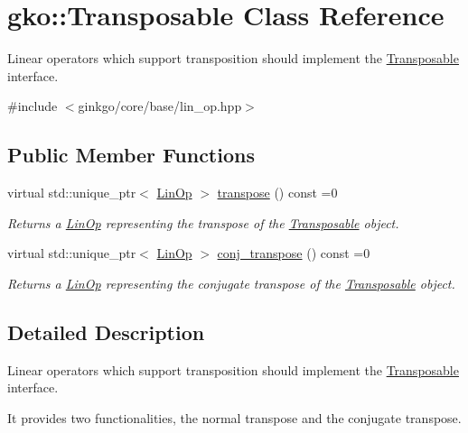 \hypertarget{classgko_1_1Transposable}{}\section{gko\+:\+:Transposable Class Reference}
\label{classgko_1_1Transposable}


Linear operators which support transposition should implement the \hyperlink{classgko_1_1Transposable}{Transposable} interface.  




{\ttfamily \#include $<$ginkgo/core/base/lin\+\_\+op.\+hpp$>$}

\subsection*{Public Member Functions}
\begin{DoxyCompactItemize}
\item 
virtual std\+::unique\+\_\+ptr$<$ \hyperlink{classgko_1_1LinOp}{Lin\+Op} $>$ \hyperlink{classgko_1_1Transposable_a5c6b778b71b47d53e0bda6ccf894d318}{transpose} () const =0
\begin{DoxyCompactList}\small\item\em Returns a \hyperlink{classgko_1_1LinOp}{Lin\+Op} representing the transpose of the \hyperlink{classgko_1_1Transposable}{Transposable} object. \end{DoxyCompactList}\item 
virtual std\+::unique\+\_\+ptr$<$ \hyperlink{classgko_1_1LinOp}{Lin\+Op} $>$ \hyperlink{classgko_1_1Transposable_ab41b669288740cf2a6f7bf76e875b077}{conj\+\_\+transpose} () const =0
\begin{DoxyCompactList}\small\item\em Returns a \hyperlink{classgko_1_1LinOp}{Lin\+Op} representing the conjugate transpose of the \hyperlink{classgko_1_1Transposable}{Transposable} object. \end{DoxyCompactList}\end{DoxyCompactItemize}


\subsection{Detailed Description}
Linear operators which support transposition should implement the \hyperlink{classgko_1_1Transposable}{Transposable} interface. 

It provides two functionalities, the normal transpose and the conjugate transpose.

